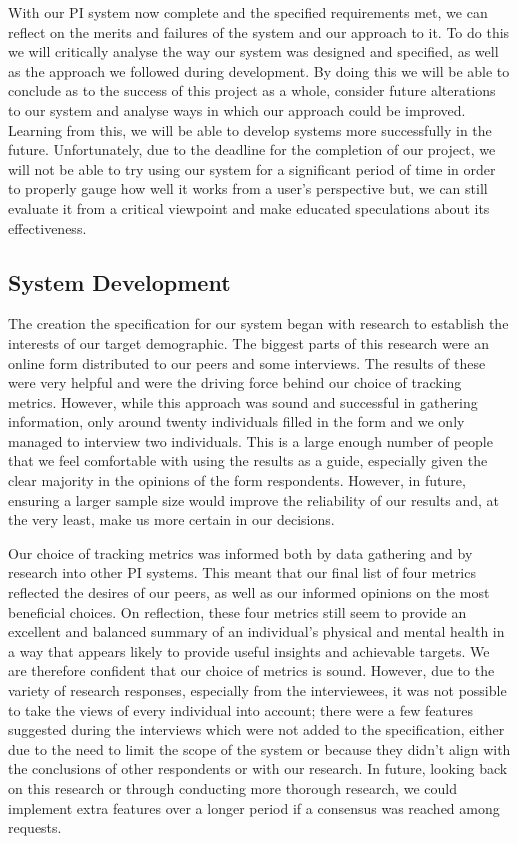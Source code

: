 \documentclass[12pt]{article}
\begin{document}
With our PI system now complete and the specified requirements met, we can 
reflect on the merits and failures of the system and our approach to it. To do 
this we will critically analyse the way our system was designed and specified, 
as well as the approach we followed during development. By doing this we will 
be able to conclude as to the success of this project as a whole, consider 
future alterations to our system and analyse ways in which our approach could 
be improved. Learning from this, we will be able to develop systems more 
successfully in the future. Unfortunately, due to the deadline for the 
completion of our  project, we will not be able to try using our system for a 
significant period of time in order to properly gauge how well it works from 
a user's perspective but, we can still evaluate it from a critical viewpoint 
and make educated speculations about its effectiveness.\par

\subsection{System Development}
The creation the specification for our system began with research to establish 
the interests of our target demographic. The biggest parts of this research 
were an online form distributed to our peers and some interviews. The results 
of these were very helpful and were the driving force behind our choice of 
tracking metrics. However, while this approach was sound and successful in 
gathering information, only around twenty individuals filled in the form and 
we only managed to interview two individuals. This is a large enough number of 
people that we feel comfortable with using the results as a guide, especially 
given the clear majority in the opinions of the form respondents. However, in 
future, ensuring a larger sample size would improve the reliability of our 
results and, at the very least, make us more certain in our decisions.\par

Our choice of tracking metrics was informed both by data gathering and by 
research into other PI systems. This meant that our final list of four metrics 
reflected the desires of our peers, as well as our informed opinions on the 
most beneficial choices. On reflection, these four metrics still seem to 
provide an excellent and balanced summary of an individual's physical and 
mental health in a way that appears likely to provide useful insights and 
achievable targets. We are therefore confident that our choice of metrics is 
sound. However, due to the variety of research responses, especially from the 
interviewees, it was not possible to take the views of every individual into 
account; there were a few features suggested during the interviews which were 
not added to the specification, either due to the need to limit the scope of 
the system or because they didn't align with the conclusions of other 
respondents or with our research. In future, looking back on this research or 
through conducting more thorough research, we could implement extra features 
over a longer period if a consensus was reached among requests.\par
\end{document}
